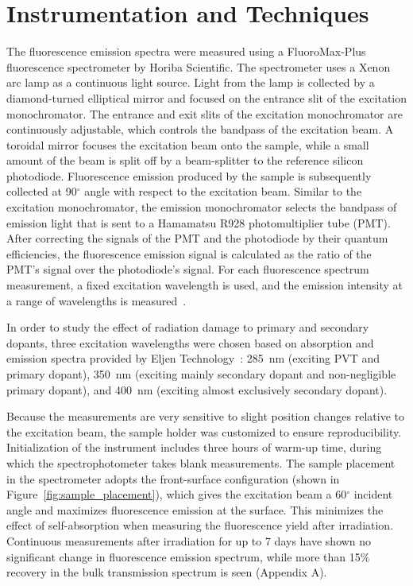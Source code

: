 \documentclass[review]{elsarticle}
\begin{document}
\section{Instrumentation and Techniques}
The fluorescence emission spectra were measured using a FluoroMax-Plus fluorescence spectrometer by Horiba Scientific. 
The spectrometer uses a Xenon arc lamp as a continuous light source. 
Light from the lamp is collected by a diamond-turned elliptical mirror and focused on the entrance slit of the excitation monochromator.
The entrance and exit slits of the excitation monochromator are continuously adjustable, 
which controls the bandpass of the excitation beam. 
A toroidal mirror focuses the excitation beam onto the sample, while a small amount of the beam is split off by a beam-splitter 
to the reference silicon photodiode. 
Fluorescence emission produced by the sample is subsequently collected at 90$^\circ$ angle with respect to the excitation beam. 
Similar to the excitation monochromator, the emission monochromator selects the bandpass of emission light that is sent to 
a Hamamatsu R928 photomultiplier tube (PMT). 
After correcting the signals of the PMT and the photodiode by their quantum efficiencies, 
the fluorescence emission signal is calculated as the ratio of the PMT's signal over the photodiode's signal. 
For each fluorescence spectrum measurement, a fixed excitation wavelength is used, 
and the emission intensity at a range of wavelengths is measured~\cite{horiba}. 

In order to study the effect of radiation damage to primary and secondary dopants, three excitation wavelengths were chosen based on 
absorption and emission spectra provided by Eljen Technology~\cite{chuck}: 
285~nm (exciting PVT and primary dopant), 
350~nm (exciting mainly secondary dopant and non-negligible primary dopant),
and 400~nm (exciting almost exclusively secondary dopant).

Because the measurements are very sensitive to slight position changes relative to the excitation beam, 
the sample holder was customized to ensure reproducibility. 
Initialization of the instrument includes three hours of warm-up time, during which the spectrophotometer takes blank measurements. 
The sample placement in the spectrometer adopts the front-surface configuration (shown in Figure~\ref{fig:sample_placement}), 
which gives the excitation beam a 60$^\circ$ incident angle and maximizes fluorescence emission at the surface. 
This minimizes the effect of self-absorption when measuring the fluorescence yield after irradiation. 
Continuous measurements after irradiation for up to 7 days have shown no significant change in fluorescence emission spectrum, 
while more than 15\% recovery in the bulk transmission spectrum is seen (Appendix A).
\end{document}
